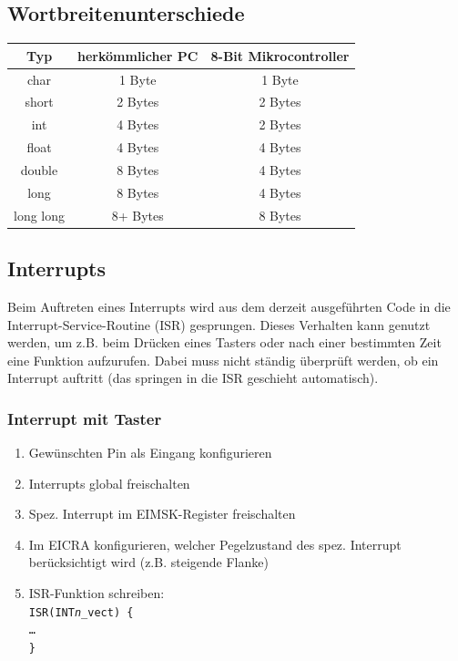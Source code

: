 \documentclass[ngerman, threecolumn, 8pt]{latex4ei/latex4ei_sheet}
\begin{document}
\subsection{Wortbreitenunterschiede}
\begin{tabular}{c|c|c}
Typ & herkömmlicher PC & 8-Bit Mikrocontroller \\ \hline
char & 1 Byte & 1 Byte\\
short & 2 Bytes & 2 Bytes \\
int & 4 Bytes & 2 Bytes  \\
float & 4 Bytes & 4 Bytes  \\
double & 8 Bytes & 4 Bytes  \\
long & 8 Bytes & 4 Bytes \\
long long & 8+ Bytes & 8 Bytes  
\end{tabular}

\begin{minipage}{\columnwidth}
\subsection{Interrupts}
Beim Auftreten eines Interrupts wird aus dem derzeit ausgeführten Code in die Interrupt-Service-Routine (ISR) gesprungen. Dieses Verhalten kann genutzt werden, um z.B. beim Drücken eines Tasters oder nach einer bestimmten Zeit eine Funktion aufzurufen. Dabei muss nicht ständig überprüft werden, ob ein Interrupt auftritt (das springen in die ISR geschieht automatisch).
\end{minipage}
\subsubsection{Interrupt mit Taster}
\begin{enumerate}
\item Gewünschten Pin als Eingang konfigurieren
\item Interrupts global freischalten
\item Spez. Interrupt im EIMSK-Register freischalten
\item Im EICRA konfigurieren, welcher Pegelzustand des spez. Interrupt berücksichtigt wird (z.B. steigende Flanke)
\item ISR-Funktion schreiben: \\
\texttt{ISR(INT\textit{n}\_vect) \{ \\ \dots \\ \} }
\end{enumerate}
\end{document}
